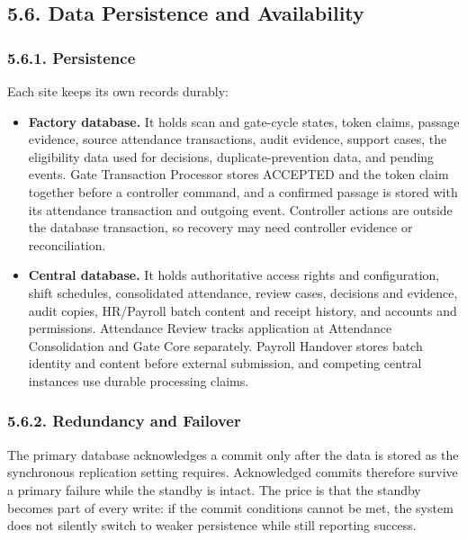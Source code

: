 \subsection*{5.6. Data Persistence and Availability}

{}

\subsubsection*{5.6.1. Persistence}

{}


Each site keeps its own records durably:

\begin{itemize}[leftmargin=36pt, itemsep=2pt, topsep=4pt, parsep=2pt]
  \item \textbf{Factory database.} It holds scan and gate-cycle states, token claims, passage evidence, source attendance transactions, audit evidence, support cases, the eligibility data used for decisions, duplicate-prevention data, and pending events. Gate Transaction Processor stores ACCEPTED and the token claim together before a controller command, and a confirmed passage is stored with its attendance transaction and outgoing event. Controller actions are outside the database transaction, so recovery may need controller evidence or reconciliation.
  \item \textbf{Central database.} It holds authoritative access rights and configuration, shift schedules, consolidated attendance, review cases, decisions and evidence, audit copies, HR/Payroll batch content and receipt history, and accounts and permissions. Attendance Review tracks application at Attendance Consolidation and Gate Core separately. Payroll Handover stores batch identity and content before external submission, and competing central instances use durable processing claims.
\end{itemize}

\subsubsection*{5.6.2. Redundancy and Failover}

{}

The primary database acknowledges a commit only after the data is stored as the synchronous replication setting requires. Acknowledged commits therefore survive a primary failure while the standby is intact. The price is that the standby becomes part of every write: if the commit conditions cannot be met, the system does not silently switch to weaker persistence while still reporting success.


